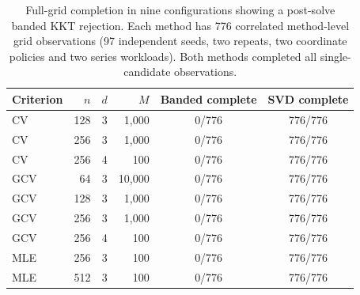 \begin{table}[t]
\caption{Full-grid completion in nine configurations showing a post-solve banded KKT rejection. Each method has 776 correlated method-level grid observations (97 independent seeds, two repeats, two coordinate policies and two series workloads). Both methods completed all single-candidate observations.}
\label{tab:grid-reliability}
\centering\scriptsize\setlength{\tabcolsep}{3.5pt}
\begin{tabular}{lrrrcc}
\toprule
Criterion & $n$ & $d$ & $M$ & Banded complete & SVD complete\\
\midrule
CV & 128 & 3 & 1,000 & 0/776 & 776/776\\
CV & 256 & 3 & 1,000 & 0/776 & 776/776\\
CV & 256 & 4 & 100 & 0/776 & 776/776\\
GCV & 64 & 3 & 10,000 & 0/776 & 776/776\\
GCV & 128 & 3 & 1,000 & 0/776 & 776/776\\
GCV & 256 & 3 & 1,000 & 0/776 & 776/776\\
GCV & 256 & 4 & 100 & 0/776 & 776/776\\
MLE & 256 & 3 & 100 & 0/776 & 776/776\\
MLE & 512 & 3 & 100 & 0/776 & 776/776\\
\bottomrule
\end{tabular}
\end{table}
